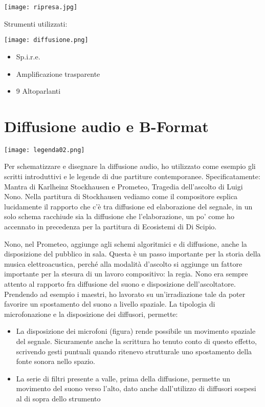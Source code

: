 \begin{center}
\texttt{[image: ripresa.jpg]}
\end{center}

Strumenti utilizzati:

\begin{center}
\texttt{[image: diffusione.png]}
\end{center}
\begin{itemize}
	\item{Sp.i.r.e.}
	\item{Amplificazione trasparente}
	\item{9 Altoparlanti}
\end{itemize}


\section{Diffusione audio e B-Format}
\begin{center}
\texttt{[image: legenda02.png]}
\end{center}


Per schematizzare e disegnare la diffusione audio, ho utilizzato come esempio gli scritti introduttivi e le legende di due partiture contemporanee. Specificatamente: Mantra di Karlheinz Stockhausen e Prometeo, Tragedia dell'ascolto di Luigi Nono. Nella partitura di Stockhausen vediamo come il compositore esplica lucidamente il rapporto che c'è tra diffusione ed elaborazione del segnale, in un solo schema racchiude sia la diffusione che l'elaborazione, un po' come ho accennato in precedenza per la partitura di Ecosistemi di Di Scipio.

Nono, nel Prometeo, aggiunge agli schemi algoritmici e di diffusione, anche la disposizione del pubblico in sala. Questa è un passo importante per la storia della musica elettroacustica, perché alla modalità d'ascolto si aggiunge un fattore importante per la stesura di un lavoro compositivo: la regia. Nono era sempre attento al rapporto fra diffusione del suono e disposizione dell'ascoltatore. \\
Prendendo ad esempio i maestri, ho lavorato su un'irradiazione tale da poter favorire un spostamento del suono a livello spaziale. La tipologia di microfonazione e la disposizione dei diffusori, permette:
\begin{itemize}
\item{La disposizione dei microfoni (figura) rende possibile un movimento spaziale del segnale. Sicuramente anche la scrittura ho tenuto conto di questo effetto, scrivendo gesti puntuali quando ritenevo strutturale uno spostamento della fonte sonora nello spazio.}
\item{La serie di filtri presente a valle, prima della diffusione, permette un movimento del suono verso l'alto, dato anche dall'utilizzo di diffusori sospesi al di sopra dello strumento}
\end{itemize}

